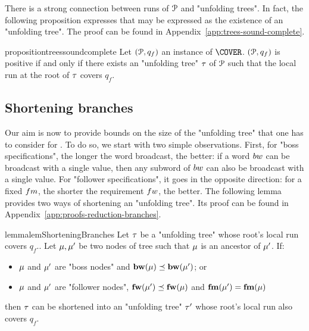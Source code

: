 
There is a strong connection between runs of $\mathcal{P}$ and "unfolding trees". In fact, the following proposition expresses that \COVER may be expressed as the existence of an "unfolding tree". 
The proof can be found in Appendix~\ref{app:trees-sound-complete}.


\begin{restatable}{proposition}{treessoundcomplete}
\label{prop:trees-sound-complete}
Let $(\mathcal{P},q_f)$ an instance of $\COVER$. $(\mathcal{P},q_f)$ is positive if and only if there exists an "unfolding tree" $\tau$ of $\mathcal{P}$ such that the local run at the root of $\tau$ covers $q_f$.
\end{restatable}



\subsection{Shortening branches}
\label{sec:decidability-shortening-branches}

Our aim is now to provide bounds on the size of the "unfolding tree" that one has to consider for \COVER. To do so, we start with two simple observations. First, for "boss specifications", the longer the word broadcast, the better: if a word $\bossspec$ can be broadcast with a single value, then any subword of $\bossspec$ can also be broadcast with a single value. 
For "follower specifications", it goes in the opposite direction: for a fixed $\followmessagespec$, the shorter the requirement $\followwordspec$, the better. The following lemma provides two ways of shortening an "unfolding tree". Its proof can be found in Appendix~\ref{app:proofs-reduction-branches}.

\begin{restatable}{lemma}{lemShorteningBranches} 
\label{lem:shortening-branches}
	Let $\tau$ be a "unfolding tree" whose root's local run covers $q_f$..
	Let $\mu, \mu'$ be two nodes of tree such that $\mu$ is an ancestor of $\mu'$. If:
	\begin{itemize}
	\item $\mu$ and $\mu'$ are "boss nodes" and $\mathbf{bw}(\mu) \preceq \mathbf{bw}(\mu')$; or
	\item $\mu$ and $\mu'$ are "follower nodes", $\mathbf{fw}(\mu') \preceq \mathbf{fw}(\mu)$ and $\mathbf{fm}(\mu')=\mathbf{fm}(\mu)$
	\end{itemize}
	then $\tau$ can be shortened into an "unfolding tree" $\tau'$ whose root's local run also covers $q_f$. 
\end{restatable}

